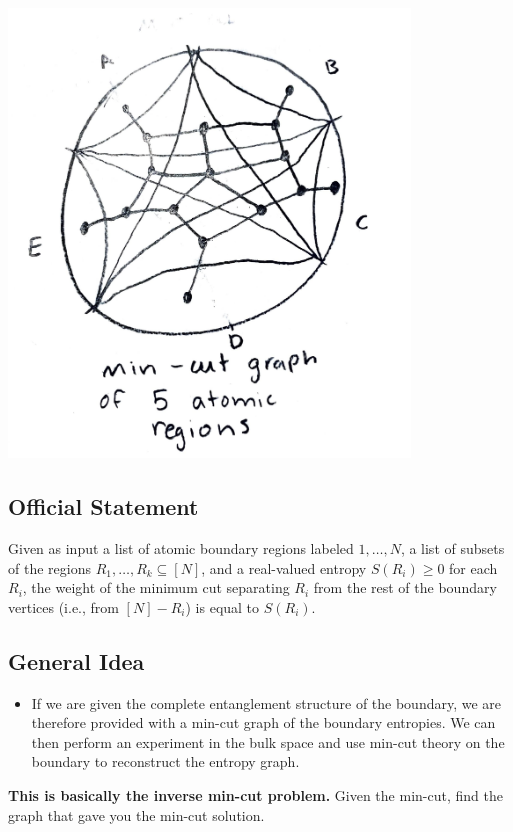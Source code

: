 \documentclass{article}
\begin{document}
\begin{center}
    \includegraphics[width=0.8\textwidth]{min_cut_graph.pdf}
\end{center}

\subsection{Official Statement}
Given as input a list of atomic boundary regions labeled \( 1, \dots, N \), a list of subsets of the regions \( R_1, \dots, R_k \subseteq [N] \), and a real-valued entropy \( S(R_i) \geq 0 \) for each \( R_i \), the weight of the minimum cut separating \( R_i \) from the rest of the boundary vertices (i.e., from \( [N] - R_i \)) is equal to \( S(R_i) \).

\subsection{General Idea}
\begin{itemize}
    \item If we are given the complete entanglement structure of the boundary, we are therefore provided with a min-cut graph of the boundary entropies. We can then perform an experiment in the bulk space and use min-cut theory on the boundary to reconstruct the entropy graph.
\end{itemize}

\textbf{This is basically the inverse min-cut problem.} Given the min-cut, find the graph that gave you the min-cut solution. 
\end{document}
